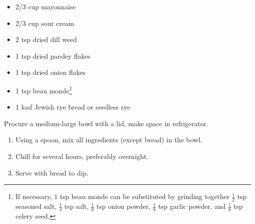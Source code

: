 \documentclass{article}
\begin{document}



\thispagestyle{firstpage}

\ingredients
\begin{itemize}
    \item 2/3 cup mayonnaise
    \item 2/3 cup sour cream
    \item 2 tsp dried dill weed
    \item 1 tsp dried parsley flakes
    \item 1 tsp dried onion flakes
    \item 1 tsp beau monde\renewcommand{\thefootnote}{\fnsymbol{footnote}}\footnote[2]{If necessary, $1$ tsp beau monde can be substituted by grinding together $\frac{1}{2}$ tsp seasoned salt, $\frac{1}{4}$ tsp salt, $\frac{1}{8}$ tsp onion powder, $\frac{1}{8}$ tsp garlic powder, and $\frac{1}{8}$ tsp celery seed.}
    \item 1 loaf Jewish rye bread or seedless rye
\end{itemize}
\instructions
Procure a medium-large bowl with a lid, make space in refrigerator.
\begin{enumerate}
    \item Using a spoon, mix all ingredients (except bread) in the bowl.
    \item Chill for several hours, preferably overnight.
    \item Serve with bread to dip.
\end{enumerate}
\end{document}
